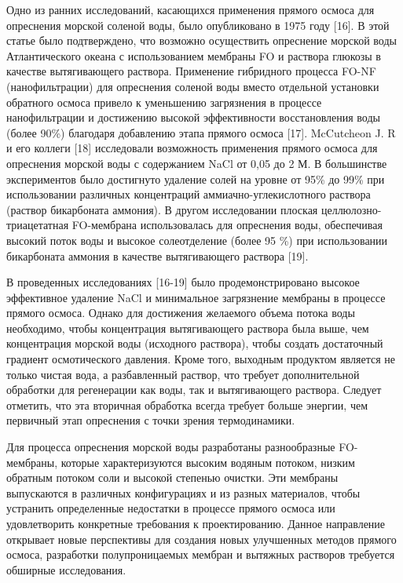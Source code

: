 \begin{multicols}{2}
Одно из ранних исследований, касающихся применения прямого осмоса для
опреснения морской соленой воды, было опубликовано в 1975 году {[}16{]}.
В этой статье было подтверждено, что возможно осуществить опреснение
морской воды Атлантического океана с использованием мембраны FO и
раствора глюкозы в качестве вытягивающего раствора. Применение
гибридного процесса FO-NF (нанофильтрации) для опреснения соленой воды
вместо отдельной установки обратного осмоса привело к уменьшению
загрязнения в процессе нанофильтрации и достижению высокой эффективности
восстановления воды (более 90\%) благодаря добавлению этапа прямого
осмоса {[}17{]}. McCutcheon J. R и его коллеги {[}18{]} исследовали
возможность применения прямого осмоса для опреснения морской воды с
содержанием NaCl от 0,05 до 2 М. В большинстве экспериментов было
достигнуто удаление солей на уровне от 95\% до 99\% при использовании
различных концентраций аммиачно-углекислотного раствора (раствор
бикарбоната аммония). В другом исследовании плоская
целлюлозно-триацетатная FO-мембрана использовалась для опреснения воды,
обеспечивая высокий поток воды и высокое солеотделение (более 95 \%) при
использовании бикарбоната аммония в качестве вытягивающего раствора
{[}19{]}.

В проведенных исследованиях {[}16-19{]} было продемонстрировано высокое
эффективное удаление NaCl и минимальное загрязнение мембраны в процессе
прямого осмоса. Однако для достижения желаемого объема потока воды
необходимо, чтобы концентрация вытягивающего раствора была выше, чем
концентрация морской воды (исходного раствора), чтобы создать
достаточный градиент осмотического давления. Кроме того, выходным
продуктом является не только чистая вода, а разбавленный раствор, что
требует дополнительной обработки для регенерации как воды, так и
вытягивающего раствора. Следует отметить, что эта вторичная обработка
всегда требует больше энергии, чем первичный этап опреснения с точки
зрения термодинамики.

Для процесса опреснения морской воды разработаны разнообразные
FO-мембраны, которые характеризуются высоким водяным потоком, низким
обратным потоком соли и высокой степенью очистки. Эти мембраны
выпускаются в различных конфигурациях и из разных материалов, чтобы
устранить определенные недостатки в процессе прямого осмоса или
удовлетворить конкретные требования к проектированию. Данное направление
открывает новые перспективы для создания новых улучшенных методов
прямого осмоса, разработки полупроницаемых мембран и вытяжных растворов
требуется обширные исследования.


\end{multicols}
